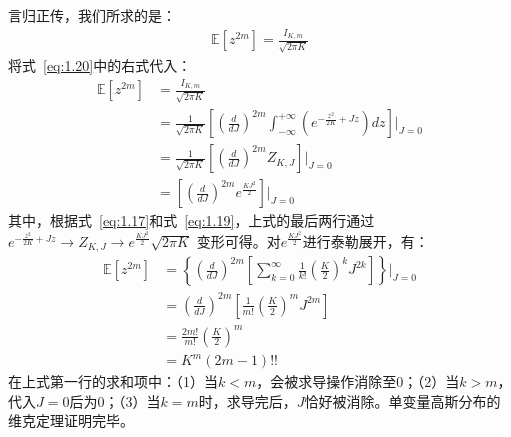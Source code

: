 言归正传，我们所求的是：
\begin{equation}
    \begin{split}
    \mathbb{E}[z^{2m}] = \frac{I_{K,m}}{\sqrt{2\pi K}}
    \end{split}
\end{equation}
将式~\eqref{eq:1.20}中的右式代入：
\begin{equation}
    \begin{split}
    \mathbb{E}[z^{2m}] 
    & = \frac{I_{K,m}}{\sqrt{2\pi K}} \\
    & = \frac{1}{\sqrt{2\pi K}}\left[
        (\frac{d}{dJ})^{2m} \int_{-\infty}^{+\infty}{
            (e^{-\frac{z^2}{2K} + Jz})    
        dz
        }
    \right] \bigg|_{J=0} \\
    & = \frac{1}{\sqrt{2\pi K}}\left[
        (\frac{d}{dJ})^{2m} 
            Z_{K,J}   
    \right] \bigg|_{J=0} \\
    & = \left[
        (\frac{d}{dJ})^{2m} 
            e^{\frac{KJ^2}{2}}
    \right] \bigg|_{J=0} 
    \end{split}
\end{equation}
其中，根据式~\eqref{eq:1.17}和式~\eqref{eq:1.19}，上式的最后两行通过$e^{-\frac{z^2}{2K}+Jz } \rightarrow Z_{K,J} \rightarrow {e^{\frac{KJ^2}{2}}}{\sqrt{2\pi K}}$ 变形可得。对$e^{\frac{KJ^2}{2}}$进行泰勒展开，有：
\begin{equation}
    \begin{split}
        \mathbb{E}\left[z^{2m}\right] 
            & = \left \{ 
                    \left ( \frac{d}{dJ}\right )^{2m}
                    \left [ \sum_{k=0}^\infty{
                        \frac{1}{k!} 
                        \left ( \frac{K}{2} \right )^k 
                        J^{2k}
                    }
                    \right ]
                \right \} \bigg|_{J=0} \\
            & = \left ( \frac{d}{dJ} \right )^{2m}
                \left [
                    \frac{1}{m!} 
                    \left ( \frac{K}{2} \right )^m 
                    J^{2m}
                \right ]
                \\
            & = 
                {
                        \frac{2m!}{m!} 
                        \left ( \frac{K}{2} \right )^m 
                } \\
            & = K^m (2m-1)!!
    \end{split}
\end{equation}
在上式第一行的求和项中：（1）当$k<m$，会被求导操作消除至$0$；（2）当$k>m$，代入$J=0$后为$0$；（3）当$k=m$时，求导完后，$J$恰好被消除。单变量高斯分布的维克定理证明完毕。

